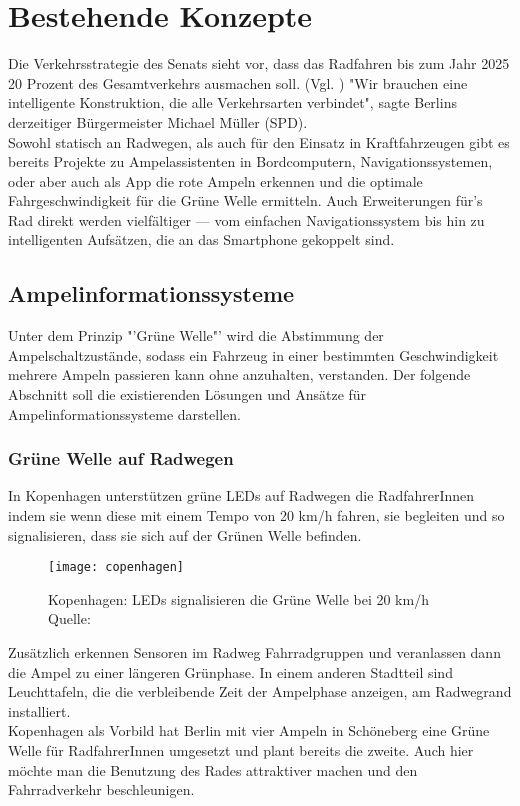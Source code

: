 \chapter{\label{chap:state}Bestehende Konzepte}
Die Verkehrsstrategie des Senats sieht vor, dass das Radfahren bis zum Jahr 2025 20 Prozent des Gesamtverkehrs ausmachen soll. (Vgl. \cite{Mopo})
"Wir brauchen eine intelligente Konstruktion, die alle Verkehrsarten verbindet", sagte Berlins derzeitiger Bürgermeister Michael Müller (SPD).\\
Sowohl statisch an Radwegen, als auch für den Einsatz in Kraftfahrzeugen gibt es bereits Projekte zu Ampelassistenten in Bordcomputern, Navigationssystemen, oder aber auch als \gls{App} die rote Ampeln erkennen und die optimale Fahrgeschwindigkeit für die Grüne Welle ermitteln. Auch Erweiterungen für's Rad direkt werden vielfältiger --- vom einfachen Navigationssystem bis hin zu intelligenten Aufsätzen, die an das \gls{Smartphone} gekoppelt sind.
\section{Ampelinformationssysteme}
Unter dem Prinzip "'Grüne Welle"' wird die Abstimmung der Ampelschaltzustände, sodass ein Fahrzeug in einer bestimmten Geschwindigkeit mehrere Ampeln passieren kann ohne anzuhalten, verstanden. Der folgende Abschnitt soll die existierenden Lösungen und Ansätze für Ampelinformationssysteme darstellen.
\subsection{Grüne Welle auf Radwegen}
In Kopenhagen unterstützen grüne \glspl{LED} auf Radwegen die RadfahrerInnen indem sie wenn diese mit einem Tempo von 20 km/h fahren, sie begleiten und so signalisieren, dass sie sich auf der Grünen Welle befinden. 
\begin{figure}[H]  
    \centering  
    \texttt{[image: copenhagen]} \label{fig:copenhagen}
    \caption[Grüne Welle durch \glspl{LED}]{Kopenhagen: \glspl{LED} signalisieren die Grüne Welle bei 20 km/h  Quelle: \cite{NYT}}
\end{figure}
Zusätzlich erkennen Sensoren im Radweg Fahrradgruppen und veranlassen dann die Ampel zu einer längeren Grünphase. In einem anderen Stadtteil sind Leuchttafeln, die die verbleibende Zeit der Ampelphase anzeigen, am Radwegrand installiert\cite{KopIng}.\\
Kopenhagen als Vorbild hat Berlin mit vier Ampeln in Schöneberg eine Grüne Welle für RadfahrerInnen umgesetzt und plant bereits die zweite\cite{BZ}. Auch hier möchte man die Benutzung des Rades attraktiver machen und den Fahrradverkehr beschleunigen.
